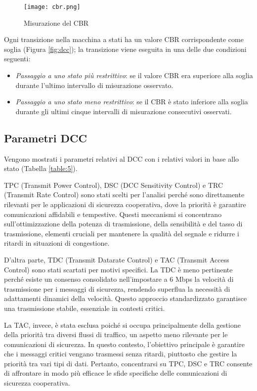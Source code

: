 \begin{figure}[h!]
    \centering
    \texttt{[image: cbr.png]}
    \caption{Misurazione del CBR}
    \label{fig:cbr}
\end{figure}

Ogni transizione nella macchina a stati ha un valore CBR corrispondente come soglia (Figura \ref{fig:dcc}); la transizione viene eseguita in
una delle due condizioni seguenti:
\begin{itemize}
    \item \textit{Passaggio a uno stato più restrittivo}: se il valore CBR era superiore alla soglia durante l'ultimo intervallo di misurazione osservato.
    \item \textit{Passaggio a uno stato meno restrittivo}: se il CBR è stato inferiore alla soglia durante gli ultimi cinque intervalli di misurazione consecutivi osservati.
\end{itemize}

\subsection[Parametri DCC]{Parametri DCC}
\label{parametri_dcc}
Vengono mostrati i parametri relativi al DCC con i relativi valori in base allo stato \cite{6686471} (Tabella \ref{table:5}).

TPC (Transmit Power Control), DSC (DCC Sensitivity Control) e TRC (Transmit Rate Control) sono stati scelti per l'analisi perché sono direttamente rilevanti per le applicazioni di sicurezza cooperativa, dove la priorità è garantire comunicazioni affidabili e tempestive. Questi meccanismi si concentrano sull'ottimizzazione della potenza di trasmissione, della sensibilità e del tasso di trasmissione, elementi cruciali per mantenere la qualità del segnale e ridurre i ritardi in situazioni di congestione.

D'altra parte, TDC (Transmit Datarate Control) e TAC (Transmit Access Control) sono stati scartati per motivi specifici. La TDC è meno pertinente perché esiste un consenso consolidato nell'impostare a 6 Mbps la velocità di trasmissione per i messaggi di sicurezza, rendendo superflua la necessità di adattamenti dinamici della velocità. Questo approccio standardizzato garantisce una trasmissione stabile, essenziale in contesti critici.

La TAC, invece, è stata esclusa poiché si occupa principalmente della gestione della priorità tra diversi flussi di traffico, un aspetto meno rilevante per le comunicazioni di sicurezza. In questo contesto, l'obiettivo principale è garantire che i messaggi critici vengano trasmessi senza ritardi, piuttosto che gestire la priorità tra vari tipi di dati. Pertanto, concentrarsi su TPC, DSC e TRC consente di affrontare in modo più efficace le sfide specifiche delle comunicazioni di sicurezza cooperativa.

